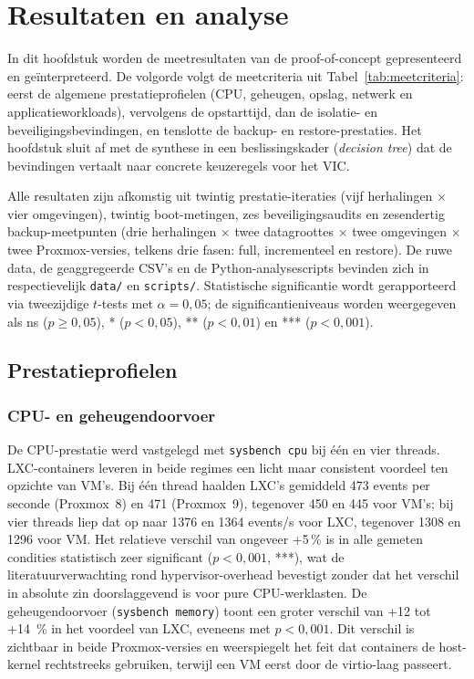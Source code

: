 
\chapter{Resultaten en analyse}%
\label{ch:resultaten}

In dit hoofdstuk worden de meetresultaten van de proof-of-concept gepresenteerd en geïnterpreteerd. De volgorde volgt de meetcriteria uit Tabel~\ref{tab:meetcriteria}: eerst de algemene prestatieprofielen (CPU, geheugen, opslag, netwerk en applicatieworkloads), vervolgens de opstarttijd, dan de isolatie- en beveiligingsbevindingen, en tenslotte de backup- en restore-prestaties. Het hoofdstuk sluit af met de synthese in een beslissingskader (\textit{decision tree}) dat de bevindingen vertaalt naar concrete keuzeregels voor het VIC.

Alle resultaten zijn afkomstig uit twintig prestatie-iteraties (vijf herhalingen $\times$ vier omgevingen), twintig boot-metingen, zes beveiligingsaudits en zesendertig backup-meetpunten (drie herhalingen $\times$ twee datagroottes $\times$ twee omgevingen $\times$ twee Proxmox-versies, telkens drie fasen: full, incrementeel en restore). De ruwe data, de geaggregeerde CSV's en de Python-analysescripts bevinden zich in respectievelijk \texttt{data/} en \texttt{scripts/}. Statistische significantie wordt gerapporteerd via tweezijdige $t$-tests met $\alpha = 0,05$; de significantieniveaus worden weergegeven als ns ($p \geq 0,05$), * ($p < 0,05$), ** ($p < 0,01$) en *** ($p < 0,001$).

\section{Prestatieprofielen}
\label{sec:prestatieprofielen}

\subsection{CPU- en geheugendoorvoer}
De CPU-prestatie werd vastgelegd met \texttt{sysbench cpu} bij één en vier threads. LXC-containers leveren in beide regimes een licht maar consistent voordeel ten opzichte van VM's. Bij één thread haalden LXC's gemiddeld 473 events per seconde (Proxmox~8) en 471 (Proxmox~9), tegenover 450 en 445 voor VM's; bij vier threads liep dat op naar 1376 en 1364 events/s voor LXC, tegenover 1308 en 1296 voor VM. Het relatieve verschil van ongeveer +5\,\% is in alle gemeten condities statistisch zeer significant ($p < 0,001$, ***), wat de literatuurverwachting rond hypervisor-overhead bevestigt zonder dat het verschil in absolute zin doorslaggevend is voor pure CPU-werklasten. De geheugendoorvoer (\texttt{sysbench memory}) toont een groter verschil van +12 tot +14~\% in het voordeel van LXC, eveneens met $p < 0,001$. Dit verschil is zichtbaar in beide Proxmox-versies en weerspiegelt het feit dat containers de host-kernel rechtstreeks gebruiken, terwijl een VM eerst door de virtio-laag passeert.


